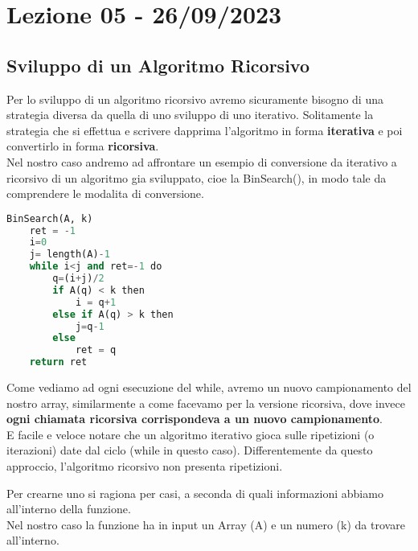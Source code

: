 \section{Lezione 05 - 26/09/2023}

\subsection{Sviluppo di un Algoritmo Ricorsivo}
Per lo sviluppo di un algoritmo ricorsivo avremo sicuramente bisogno di una strategia diversa da quella di uno sviluppo di uno iterativo. Solitamente la strategia che si effettua e scrivere dapprima l'algoritmo in forma \textbf{iterativa} e poi convertirlo in forma \textbf{ricorsiva}.\\
Nel nostro caso andremo ad affrontare un esempio di conversione da iterativo a ricorsivo di un algoritmo gia sviluppato, cioe la BinSearch(), in modo tale da comprendere le modalita di conversione.\\

\begin{lstlisting}[language=Python]
BinSearch(A, k) 
	ret = -1
	i=0
	j= length(A)-1
	while i<j and ret=-1 do
		q=(i+j)/2
		if A(q) < k then
			i = q+1
		else if A(q) > k then
			j=q-1
		else
			ret = q
	return ret
\end{lstlisting}

Come vediamo ad ogni esecuzione del while, avremo un nuovo campionamento del nostro array, similarmente a come facevamo per la versione ricorsiva, dove invece \textbf{ogni chiamata ricorsiva corrispondeva a un nuovo campionamento}.\\

E facile e veloce notare che un algoritmo iterativo gioca sulle ripetizioni (o iterazioni) date dal ciclo (while in questo caso). Differentemente da questo approccio, l'algoritmo ricorsivo non presenta ripetizioni.

Per crearne uno si ragiona per casi, a seconda di quali informazioni abbiamo all'interno della funzione.\\

Nel nostro caso la funzione ha in input un Array (A) e un numero (k) da trovare all'interno.

